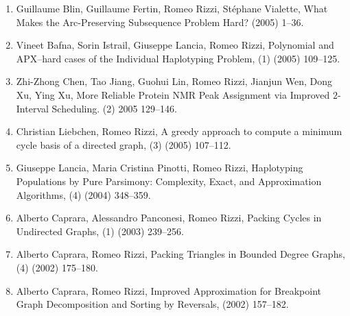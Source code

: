 \documentclass[10pt]{article}
\begin{document}
\begin{enumerate}
  \item {\sc Guillaume Blin, Guillaume Fertin, Romeo Rizzi,
                  St\'ephane Vialette},
   \newblock What Makes the Arc-Preserving Subsequence Problem Hard?
    (2005) 1--36.

  \item {\sc Vineet Bafna, Sorin Istrail, Giuseppe Lancia, Romeo Rizzi},
   \newblock  Polynomial and APX--hard cases of the Individual Haplotyping Problem,
   (1) (2005) 109--125.

  \item {\sc Zhi-Zhong Chen, Tao Jiang, Guohui Lin, Romeo Rizzi,
                  Jianjun Wen, Dong Xu, Ying Xu},
   \newblock  More Reliable Protein NMR Peak Assignment via Improved
        $2$-Interval Scheduling.
   (2) 2005 129--146.

  \item {\sc Christian Liebchen, Romeo Rizzi},
   \newblock  A greedy approach to compute a minimum cycle basis
              of a directed graph,
   (3) (2005) 107--112.

  \item {\sc Giuseppe Lancia, Maria Cristina Pinotti, Romeo Rizzi},
   \newblock  Haplotyping Populations by Pure Parsimony: Complexity, 
              Exact, and Approximation Algorithms,
   (4) (2004) 348--359.

  \item {\sc Alberto Caprara, Alessandro Panconesi, Romeo Rizzi},
   \newblock  Packing Cycles in Undirected Graphs,
   (1) (2003) 239--256.


  \item {\sc Alberto Caprara, Romeo Rizzi},
   \newblock  Packing Triangles in Bounded Degree Graphs,
   (4) (2002) 175--180.

  \item {\sc Alberto Caprara, Romeo Rizzi},
   \newblock  Improved Approximation for Breakpoint Graph Decomposition
              and Sorting by Reversals,
    (2002) 157--182.


\end{enumerate}
\end{document}
